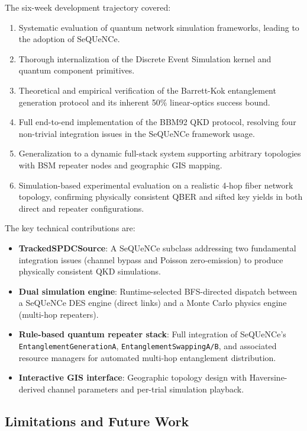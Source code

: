 \documentclass[12pt,oneside,letterpaper,english]{article}
\begin{document}
The six-week development trajectory covered:
\begin{enumerate}
    \item Systematic evaluation of quantum network simulation frameworks, leading to the adoption of SeQUeNCe.
    \item Thorough internalization of the Discrete Event Simulation kernel and quantum component primitives.
    \item Theoretical and empirical verification of the Barrett-Kok entanglement generation protocol and its inherent 50\% linear-optics success bound.
    \item Full end-to-end implementation of the BBM92 QKD protocol, resolving four non-trivial integration issues in the SeQUeNCe framework usage.
    \item Generalization to a dynamic full-stack system supporting arbitrary topologies with BSM repeater nodes and geographic GIS mapping.
    \item Simulation-based experimental evaluation on a realistic 4-hop fiber network topology, confirming physically consistent QBER and sifted key yields in both direct and repeater configurations.
\end{enumerate}

The key technical contributions are:
\begin{itemize}
    \item \textbf{TrackedSPDCSource}: A SeQUeNCe subclass addressing two fundamental integration issues (channel bypass and Poisson zero-emission) to produce physically consistent QKD simulations.
    \item \textbf{Dual simulation engine}: Runtime-selected BFS-directed dispatch between a SeQUeNCe DES engine (direct links) and a Monte Carlo physics engine (multi-hop repeaters).
    \item \textbf{Rule-based quantum repeater stack}: Full integration of SeQUeNCe's \texttt{EntanglementGenerationA}, \texttt{EntanglementSwappingA/B}, and associated resource managers for automated multi-hop entanglement distribution.
    \item \textbf{Interactive GIS interface}: Geographic topology design with Haversine-derived channel parameters and per-trial simulation playback.
\end{itemize}

\subsection{Limitations and Future Work}
\end{document}
